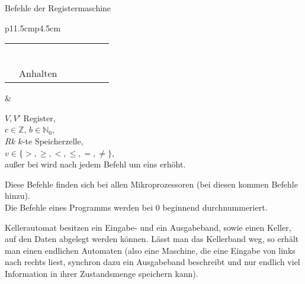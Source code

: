 \begin{Def}{Befehle der Registermaschine} \\
    \begin{tabular}{p{11.5cm}p{4.5cm}}
        \begin{minipage}[c]{11.5cm}
    \begin{tabular}{lp{3cm}|ll|lll}
\assembler{load V,c} & \pseudocode{V := c} &
\assembler{copy V,V'} & \pseudocode{V := V'} \\
\assembler{read V} & \pseudocode{V := R<A>} &
\assembler{write V} & \pseudocode{R<A> := V} \\
\assembler{add} & \pseudocode{X := Y + Z} &
\assembler{sub} & \pseudocode{X := Y - Z} \\
\assembler{succ} & \pseudocode{X := X + 1} &
\assembler{shift} & \pseudocode{X := X div 2} \\ \hline
\assembler{comp (v)} &
\multicolumn{3}{l|}{\pseudocode{if XvY then F := 1 else F := 0 fi}} \\
\assembler{jump b} &
\multicolumn{3}{l|}{\pseudocode{if F=1 then B := b else B := B + 1 fi}} \\ \hline
\assembler{stop} & Anhalten
    \end{tabular}
        \end{minipage}
        &
        \begin{minipage}[c]{4.5cm}
            $V, V'$ Register, \\
            $c \in \mathbb{Z}$, \quad
            $b \in \mathbb{N}_0$, \\
            $Rk$ $k$-te Speicherzelle, \\
            $v \in \{>, \ge, <, \le, =, \not=\}$, \\
            außer bei  wird nach jedem Befehl 
            um eins erhöht.
        \end{minipage}
    \end{tabular}

    Diese Befehle finden sich bei allen Mikroprozessoren (bei diesen kommen
    Befehle hinzu). \\
    Die Befehle eines Programms werden bei 0 beginnend durchnummeriert.
\end{Def}

\begin{Def}{Kellerautomat}
     besitzen ein Eingabe- und ein
    Ausgabeband, sowie einen Keller, auf den Daten abgelegt werden können.
    Lässt man das Kellerband weg, so erhält man einen endlichen Automaten
    (also eine Maschine, die eine Eingabe von links nach rechts liest,
    synchron dazu ein Ausgabeband beschreibt und nur endlich viel Information
    in ihrer Zustandsmenge speichern kann).
\end{Def}


